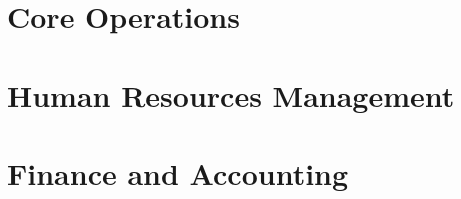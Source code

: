 \documentclass[11pt,a4paper,fleqn]{book} %
\begin{document}
\tableofcontents %

\pagestyle{fancy} %

\part{Core Operations}







\part{Human Resources Management}


\part{Finance and Accounting}

\appendix

\end{document}
